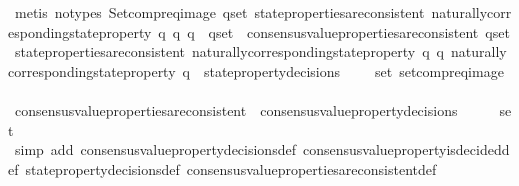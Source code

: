 \begin{isabellebody}
\ {\isacharparenleft}metis\ {\isacharparenleft}no{\isacharunderscore}types{\isacharparenright}\ Setcompr{\isacharunderscore}eq{\isacharunderscore}image\ {\isacartoucheopen}{\isasymforall}q{\isacharunderscore}set{\isachardot}\ state{\isacharunderscore}properties{\isacharunderscore}are{\isacharunderscore}consistent\ {\isacharbraceleft}naturally{\isacharunderscore}corresponding{\isacharunderscore}state{\isacharunderscore}property\ q\ {\isacharbar}q{\isachardot}\ q\ {\isasymin}\ q{\isacharunderscore}set{\isacharbraceright}\ {\isasymlongrightarrow}\ consensus{\isacharunderscore}value{\isacharunderscore}properties{\isacharunderscore}are{\isacharunderscore}consistent\ q{\isacharunderscore}set{\isacartoucheclose}\ {\isacartoucheopen}state{\isacharunderscore}properties{\isacharunderscore}are{\isacharunderscore}consistent\ {\isacharbraceleft}naturally{\isacharunderscore}corresponding{\isacharunderscore}state{\isacharunderscore}property\ q\ {\isacharbar}q{\isachardot}\ naturally{\isacharunderscore}corresponding{\isacharunderscore}state{\isacharunderscore}property\ q\ {\isasymin}\ {\isasymUnion}{\isacharbraceleft}state{\isacharunderscore}property{\isacharunderscore}decisions\ {\isasymsigma}\ {\isacharbar}{\isasymsigma}{\isachardot}\ {\isasymsigma}\ {\isasymin}\ {\isasymsigma}{\isacharunderscore}set{\isacharbraceright}{\isacharbraceright}{\isacartoucheclose}\ setcompr{\isacharunderscore}eq{\isacharunderscore}image{\isacharparenright}\isanewline
\ \ \isamarkupfalse%
\isanewline
\ \ \isamarkupfalse%
\ {\isachardoublequoteopen}consensus{\isacharunderscore}value{\isacharunderscore}properties{\isacharunderscore}are{\isacharunderscore}consistent\ {\isacharparenleft}{\isasymUnion}\ {\isacharbraceleft}consensus{\isacharunderscore}value{\isacharunderscore}property{\isacharunderscore}decisions\ {\isasymsigma}\ {\isacharbar}\ {\isasymsigma}{\isachardot}\ {\isasymsigma}\ {\isasymin}\ {\isasymsigma}{\isacharunderscore}set{\isacharbraceright}{\isacharparenright}{\isachardoublequoteclose}\ \isanewline
\ \ \ \ \isamarkupfalse%
\ {\isacharparenleft}simp\ add{\isacharcolon}\ consensus{\isacharunderscore}value{\isacharunderscore}property{\isacharunderscore}decisions{\isacharunderscore}def\ consensus{\isacharunderscore}value{\isacharunderscore}property{\isacharunderscore}is{\isacharunderscore}decided{\isacharunderscore}def\ state{\isacharunderscore}property{\isacharunderscore}decisions{\isacharunderscore}def\ consensus{\isacharunderscore}value{\isacharunderscore}properties{\isacharunderscore}are{\isacharunderscore}consistent{\isacharunderscore}def{\isacharparenright}\isanewline

\end{isabellebody}
